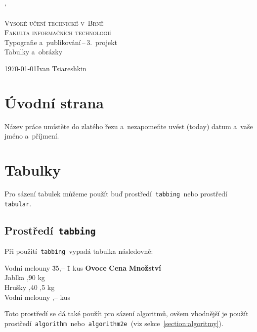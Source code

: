 \documentclass[a4paper, 11pt]{article}
\begin{document}
\catcode`

\begin{titlepage}
    \begin{center}
        \textsc{\Huge {Vysoké učení technické v~Brně} \\ [0.4em]}
        \textsc{\huge {Fakulta informačních technologií}} \\
        {\LARGE Typografie a~publikování\,--\,3.~projekt} \\
        \Huge{Tabulky a~obrázky}
    \end{center}
    \Large{\today \hfill Ivan Tsiareshkin} 
\end{titlepage}


\section{Úvodní strana}
    Název práce umístěte do zlatého řezu a~nezapomeňte uvést  (today) datum a~vaše jméno a~příjmení.

\section{Tabulky}
    Pro sázení tabulek můžeme použít buď prostředí\texttt{ tabbing }nebo prostředí\texttt{ tabular}.

    \subsection{Prostředí\texttt{ tabbing }}
        Při použití\texttt{ tabbing }vypadá tabulka následovně:    
        \begin{tabbing}
            Vodní melouny \quad	\= 35,-- \qquad \= 1 kus \kill
            \textbf{Ovoce} \> \textbf{Cena} \> \textbf{Množství} \\
            Jablka ,90  kg	\\
            Hrušky ,40	,5 kg \\
            Vodní melouny ,--  kus	\\
        \end{tabbing}   
        
        \noindent Toto prostředí se dá také použít pro sázení algoritmů, ovšem vhodnější je použít prostředí\texttt{ algorithm }nebo\texttt{ algorithm2e }(viz sekce~\ref{section:algoritmy}).
\end{document}
